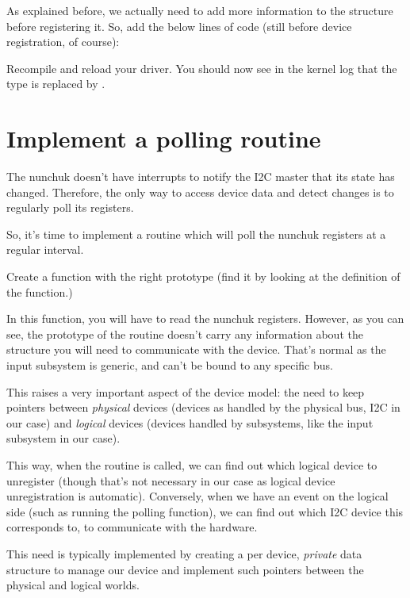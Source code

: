 As explained before, we actually need to add more information to the 
structure before registering it. So, add the below lines of code (still before
device registration, of course):


Recompile and reload your driver. You should now see in the kernel log
that the  type is replaced by
.

\section{Implement a polling routine}

The nunchuk doesn't have interrupts to notify the I2C master that
its state has changed. Therefore, the only way to access device data
and detect changes is to regularly poll its registers.

So, it's time to implement a routine which will poll the nunchuk registers
at a regular interval.

Create a  function with the right prototype (find
it by looking at the definition of the  function.)

In this function, you will have to read the nunchuk registers. However,
as you can see, the prototype of the  routine doesn't
carry any information about the  structure you will
need to communicate with the device. That's normal as the input
subsystem is generic, and can't be bound to any specific bus.

This raises a very important aspect of the device model: the need to
keep pointers between {\em physical} devices (devices as handled by the
physical bus, I2C in our case) and {\em logical} devices (devices
handled by subsystems, like the input subsystem in our case).

This way, when the  routine is called, we can find out
which logical device to unregister (though that's not necessary in our
case as logical device unregistration is automatic). Conversely, when we
have an event on the logical side (such as running the polling
function), we can find out which I2C device this corresponds to,
to communicate with the hardware.

This need is typically implemented by creating a per device, {\em private} data
structure to manage our device and implement such pointers between
the physical and logical worlds.

